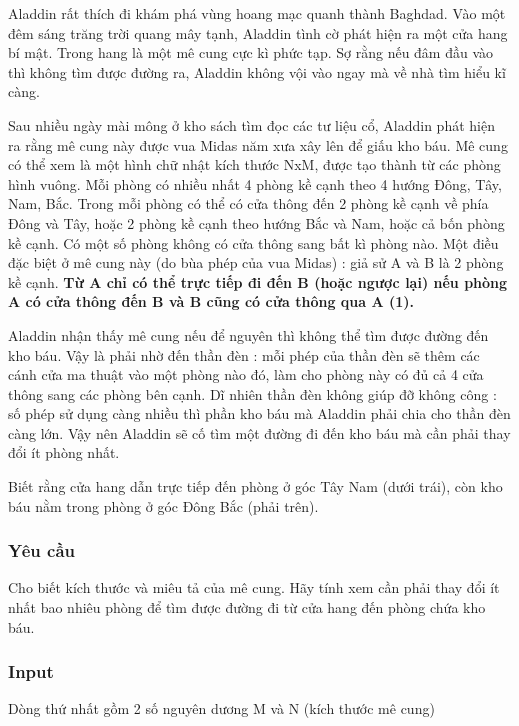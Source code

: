 

Aladdin rất thích đi khám phá vùng hoang mạc quanh thành Baghdad. Vào một đêm sáng trăng trời quang mây tạnh, Aladdin tình cờ phát hiện ra một cửa hang bí mật. Trong hang là một mê cung cực kì phức tạp. Sợ rằng nếu đâm đầu vào thì không tìm được đường ra, Aladdin không vội vào ngay mà về nhà tìm hiểu kĩ càng.

Sau nhiều ngày mài mông ở kho sách tìm đọc các tư liệu cổ, Aladdin phát hiện ra rằng mê cung này được vua Midas năm xưa xây lên để giấu kho báu. Mê cung có thể xem là một hình chữ nhật kích thước NxM, được tạo thành từ các phòng hình vuông. Mỗi phòng có nhiều nhất 4 phòng kề cạnh theo 4 hướng Đông, Tây, Nam, Bắc. Trong mỗi phòng có thể có cửa thông đến 2 phòng kề cạnh về phía Đông và Tây, hoặc 2 phòng kề cạnh theo hướng Bắc và Nam, hoặc cả bốn phòng kề cạnh. Có một số phòng không có cửa thông sang bất kì phòng nào. Một điều đặc biệt ở mê cung này (do bùa phép của vua Midas) : giả sử A và B là 2 phòng kề cạnh. \textbf{Từ A chỉ có thể trực tiếp đi đến B (hoặc ngược lại) nếu phòng A có cửa thông đến B và B cũng có cửa thông qua A (1).}

Aladdin nhận thấy mê cung nếu để nguyên thì không thể tìm được đường đến kho báu. Vậy là phải nhờ đến thần đèn : mỗi phép của thần đèn sẽ thêm các cánh cửa ma thuật vào một phòng nào đó, làm cho phòng này có đủ cả 4 cửa thông sang các phòng bên cạnh. Dĩ nhiên thần đèn không giúp đỡ không công : số phép sử dụng càng nhiều thì phần kho báu mà Aladdin phải chia cho thần đèn càng lớn. Vậy nên Aladdin sẽ cố tìm một đường đi đến kho báu mà cần phải thay đổi ít phòng nhất.

Biết rằng cửa hang dẫn trực tiếp đến phòng ở góc Tây Nam (dưới trái), còn kho báu nằm trong phòng ở góc Đông Bắc (phải trên).

\subsubsection{Yêu cầu}

Cho biết kích thước và miêu tả của mê cung. Hãy tính xem cần phải thay đổi ít nhất bao nhiêu phòng để tìm được đường đi từ cửa hang đến phòng chứa kho báu.

\subsubsection{Input}

Dòng thứ nhất gồm 2 số nguyên dương M và N (kích thước mê cung)

